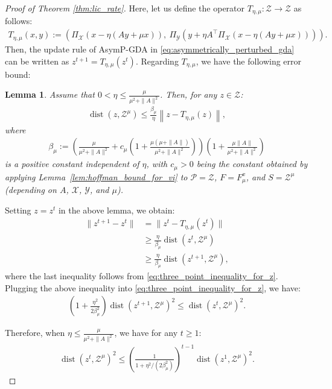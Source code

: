 \documentclass{article}
\DeclareMathOperator{\dist}{dist}
\newcommand{\X}{\mathcal{X}}
\newcommand{\Y}{\mathcal{Y}}
\newcommand{\Z}{\mathcal{Z}}
\theoremstyle{plain}
\newtheorem{lemma}[theorem]{Lemma}
\begin{document}
\begin{proof}[Proof of Theorem \ref{thm:lic_rate}]
    Here, let us define the operator $T_{\eta, \mu}: \Z \to \Z$ as follows:
    \begin{align*}
        T_{\eta, \mu}(x, y) := \left(\Pi_{\X}\left(x - \eta \left(Ay + \mu x\right)\right),~ \Pi_{\Y}\left(y + \eta A^{\top}\Pi_{\X}\left(x - \eta \left(Ay + \mu x\right)\right)\right)\right).
    \end{align*}
    Then, the update rule of AsymP-GDA in \eqref{eq:asymmetrically_perturbed_gda} can be written as $z^{t+1} = T_{\eta, \mu}(z^t)$.
    Regarding $T_{\eta, \mu}$, we have the following error bound:
    \begin{lemma}
        Assume that $0 < \eta \leq \frac{\mu}{\mu^2 + \|A\|^2}$.
        Then, for any $z\in \Z$:
        \begin{align*}
            \dist(z, \Z^{\mu}) \leq \frac{\beta_{\mu}}{\eta}\left\|z - T_{\eta, \mu}(z)\right\|,
        \end{align*}
        where
        \begin{align}
            \beta_{\mu} := \left(\frac{\mu}{\mu^2 + \|A\|^2} + c_{\mu}\left(1 + \frac{\mu (\mu + \|A\|)}{\mu^2 + \|A\|^2}\right)\right)\left(1 + \frac{\mu\|A\|}{\mu^2 + \|A\|^2}\right)
            \label{eq:def_beta_mu}
        \end{align}
        is a positive constant independent of $\eta$, with $c_{\mu} > 0$ being the constant obtained by applying Lemma~\ref{lem:hoffman_bound_for_vi} to $\mathcal{P}=\Z$, $F=F_{\mu}^x$, and $S=\Z^{\mu}$ (depending on $A$, $\X$, $\Y$, and $\mu$).
        \label{lem:learning_rate_dependent_error_bound}
    \end{lemma}

    Setting $z = z^t$ in the above lemma, we obtain:
    \begin{align*}
        \|z^{t+1} - z^t\| & = \|z^t - T_{\eta, \mu}(z^t)\|                         \\
        & \geq \frac{\eta}{\beta_{\mu}} \dist(z^t, \Z^{\mu})      \\
        & \geq \frac{\eta}{\beta_{\mu}} \dist(z^{t+1}, \Z^{\mu}),
    \end{align*}
    where the last inequality follows from \eqref{eq:three_point_inequality_for_z}.
    Plugging the above inequality into \eqref{eq:three_point_inequality_for_z}, we have:
    \begin{align*}
        \left(1 + \frac{\eta^2}{2\beta_{\mu}^2}\right)\dist(z^{t+1}, \Z^{\mu})^2 \leq \dist(z^t, \Z^{\mu})^2.
    \end{align*}

    Therefore, when $\eta \leq \frac{\mu}{\mu^2 + \|A\|^2}$, we have for any $t\geq 1$:
    \begin{align*}
        \dist(z^t, \Z^{\mu})^2 \leq \left(\frac{1}{1 + \eta^2 / (2\beta_{\mu}^2)}\right)^{t-1} \dist(z^1, \Z^{\mu})^2.
    \end{align*}
\end{proof}
\end{document}
